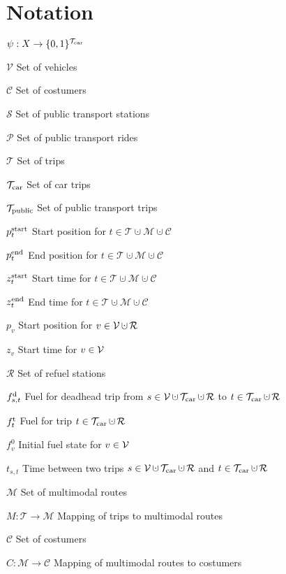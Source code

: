 \section*{Notation}

\begin{labeling}{$\psi:X\to\{0,1\}^{\mathcal{T}_{\operatorname{car}}}$}
	\item[$\mathcal{V}$]{Set of vehicles}
	\item[$\mathcal{C}$]{Set of costumers}
	\item[$\mathcal{S}$]{Set of public transport stations}
	\item[$\mathcal{P}$]{Set of public transport rides}
	\item[$\mathcal{T}$]{Set of trips}
	\item[$\mathcal{T}_{\operatorname{car}}$]{Set of car trips}
	\item[$\mathcal{T}_{\operatorname{public}}$]{Set of public transport trips}
	\item[$p^{\operatorname{start}}_t$]{Start position for $t\in\mathcal{T}\cupdot\mathcal{M}\cupdot\mathcal{C}$}
	\item[$p^{\operatorname{end}}_t$]{End position for $t\in\mathcal{T}\cupdot\mathcal{M}\cupdot\mathcal{C}$}
	\item[$z^{\operatorname{start}}_t$]{Start time for $t\in\mathcal{T}\cupdot\mathcal{M}\cupdot\mathcal{C}$}
	\item[$z^{\operatorname{end}}_t$]{End time for $t\in\mathcal{T}\cupdot\mathcal{M}\cupdot\mathcal{C}$}
	\item[$p_v$]{Start position for $\vinV\cupdot\mathcal{R}$}
	\item[$z_v$]{Start time for $v\in\mathcal{V}$}
	\item[$\mathcal{R}$]{Set of refuel stations}
	\item[$f^{\operatorname{d}}_{s,t}$]{Fuel for deadhead trip from $s\in\mathcal{V}\cupdot\Tcar\cupdot\mathcal{R}$ to $t\in\Tcar\cupdot\mathcal{R}$}
	\item[$f^{\operatorname{t}}_t$]{Fuel for trip $t\in\Tcar\cupdot\mathcal{R}$}
	\item[$f^0_v$]{Initial fuel state for $v\in\mathcal{V}$}
	\item[$t_{s,t}$]{Time between two trips $s\in\mathcal{V}\cupdot\Tcar\cupdot\mathcal{R}$ and $t\in\Tcar\cupdot\mathcal{R}$}
	\item[$\mathcal{M}$]{Set of multimodal routes}
	\item[$M:\mathcal{T}\to\mathcal{M}$]{Mapping of trips to multimodal routes}
	\item[$\mathcal{C}$]{Set of costumers}
	\item[$C:\mathcal{M}\to\mathcal{C}$]{Mapping of multimodal routes to costumers}

\end{labeling}
